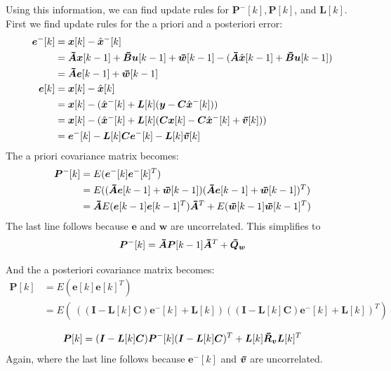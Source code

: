 Using this information, we can find update rules for $\bm{P}^-[k], \bm{P}[k]$, and $\bm{L}[k]$. First we find update rules for the a priori and a posteriori error:
\begin{align*}
    \bm{e}^-[k] &= \bm{x}[k]-\hat{\bm{x}}^-[k] \\
                &= \thickbar{\bm{A}}\bm{x}[k-1] + \thickbar{\bm{B}}\bm{u}[k-1] + \thickbar{\bm{w}}[k-1] - (\thickbar{\bm{A}}\hat{\bm{x}}[k-1] + \thickbar{\bm{B}}\bm{u}[k-1]) \\
                &= \thickbar{\bm{A}}\bm{e}[k-1] + \thickbar{\bm{w}}[k-1] \\
    \bm{e}[k]&= \bm{x}[k] -\hat{\bm{x}}[k] \\
             &= \bm{x}[k] - (\bmhat{x}^-[k]+\bm{L}[k](\bm{y}-\bm{C}\bmhat{x}^-[k])) \\
             &= \bm{x}[k] - (\bmhat{x}^-[k]+\bm{L}[k](\bm{C}\bm{x}[k] -\bm{C}\bmhat{x}^-[k]+\bmbar{v}[k])) \\
             &= \bm{e}^-[k] - \bm{L}[k]\bm{C}\bm{e}^-[k]-\bm{L}[k]\bmbar{v}[k]
\end{align*}
The a priori covariance matrix becomes:
\begin{align*}
    \bm{P}^-[k] &= E(\bm{e}^-[k]\bm{e}^-[k]^T) \\
                &= E((\thickbar{\bm{A}}\bm{e}[k-1] + \thickbar{\bm{w}}[k-1])(\thickbar{\bm{A}}\bm{e}[k-1] + \thickbar{\bm{w}}[k-1])^T) \\
                &= \thickbar{\bm{A}}E(\bm{e}[k-1]\bm{e}[k-1]^T)\thickbar{\bm{A}}^T + E(\thickbar{\bm{w}}[k-1]\thickbar{\bm{w}}[k-1]^T)
\end{align*}
The last line follows because $\bm{e}$ and $\bm{w}$ are uncorrelated. This simplifies to
\begin{equation}
\bm{P}^-[k] = \thickbar{\bm{A}}\bm{P}[k-1]\thickbar{\bm{A}}^T + \thickbar{\bm{Q}}_{\bm{w}}
\end{equation}

And the a posteriori covariance matrix becomes:
\begin{align*}
    \bm{P}[k] &= E(\bm{e}[k]\bm{e}[k]^T) \\
              &= E(\ ((\bm{I} - \bm{L}[k]\bm{C})\bm{e}^-[k]+\bm{L}[k])((\bm{I} - \bm{L}[k]\bm{C})\bm{e}^-[k]+\bm{L}[k])^T) \\
\end{align*}
\begin{equation}
              \bm{P}[k] = (\bm{I} - \bm{L}[k]\bm{C})\bm{P}^-[k](\bm{I} - \bm{L}[k]\bm{C})^T + \bm{L}[k]\bmbar{R}_{\bm{v}}\bm{L}[k]^T
\end{equation}
Again, where the last line follows because $\bm{e}^-[k]$ and $\bmbar{v}$ are uncorrelated.

